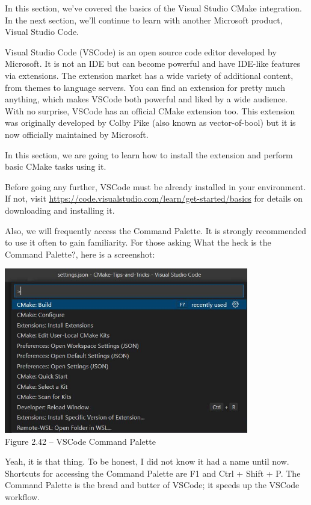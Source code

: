 In this section, we've covered the basics of the Visual Studio CMake integration. In the next section, we'll continue to learn with another Microsoft product, Visual Studio Code.


Visual Studio Code (VSCode) is an open source code editor developed by Microsoft. It is not an IDE but can become powerful and have IDE-like features via extensions. The extension market has a wide variety of additional content, from themes to language servers. You can find an extension for pretty much anything, which makes VSCode both powerful and liked by a wide audience. With no surprise, VSCode has an official CMake extension too. This extension was originally developed by Colby Pike (also known as vector-of-bool) but it is now officially maintained by Microsoft. 

In this section, we are going to learn how to install the extension and perform basic CMake tasks using it.

Before going any further, VSCode must be already installed in your environment. If not, visit \url{https://code.visualstudio.com/learn/get-started/basics} for details on downloading and installing it.

Also, we will frequently access the Command Palette. It is strongly recommended to use it often to gain familiarity. For those asking What the heck is the Command Palette?, here is a screenshot:

\begin{center}
\includegraphics[width=0.8\textwidth]{content/1/chapter2/images/42.jpg}\\
Figure 2.42 – VSCode Command Palette
\end{center}

Yeah, it is that thing. To be honest, I did not know it had a name until now. Shortcuts for accessing the Command Palette are F1 and Ctrl + Shift + P. The Command Palette is the bread and butter of VSCode; it speeds up the VSCode workflow.

